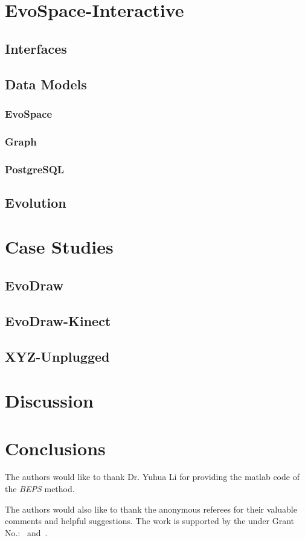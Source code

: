 \section{EvoSpace-Interactive}
  \subsection{Interfaces}
  \subsection{Data Models}
    \subsubsection{EvoSpace}
    \subsubsection{Graph}
    \subsubsection{PostgreSQL}
  \subsection{Evolution}

\section{Case Studies}
\subsection{EvoDraw}
\subsection{EvoDraw-Kinect}
\subsection{XYZ-Unplugged}

\section{Discussion}
\section{Conclusions}

\begin{acks}
  The authors would like to thank Dr. Yuhua Li for providing the
  matlab code of  the \textit{BEPS} method. 

  The authors would also like to thank the anonymous referees for
  their valuable comments and helpful suggestions. The work is
  supported by the  under Grant
  No.:~
  and~.

\end{acks}

